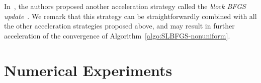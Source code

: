 \documentclass[10pt,twocolumn,journal]{IEEEtran}
\begin{document}





\begin{remark}
In~\cite{Gower_16}, the authors proposed another acceleration strategy called the {\em block BFGS update}~\cite{Gower_14,Hennig_15}. We remark that this strategy can be straightforwardly combined with all the other acceleration strategies proposed above, and may result in further acceleration of the convergence of Algorithm~\ref{algo:SLBFGS-nonuniform}.  %
\end{remark}


\section{Numerical Experiments}\label{sec:experiments}
\end{document}
